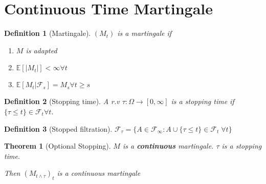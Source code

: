 \documentclass{article}
\newtheorem{theorem}{Theorem}
\newtheorem{definition}{Definition}
\begin{document}
\section{Continuous Time Martingale}
\begin{definition}[Martingale]
  $(M_t)$ is a martingale if
  \begin{enumerate}
  \item $M$ is adapted
  \item $\mathbb E[|M_t|] < \infty \forall t$
  \item $\mathbb E[M_t | \mathcal F_s] = M_s \forall t \ge s$
  \end{enumerate}
\end{definition}

\begin{definition}[Stopping time]
  A r.v $\tau :\Omega \rightarrow [0, \infty]$ is a stopping time if $\{ \tau \le t \} \in \mathcal F_t \forall t$.
\end{definition}
\begin{definition}[Stopped filtration]
  $\mathcal F_{\tau} = \{ A \in \mathcal F_{\infty} : A \cup \{ \tau \le t \} \in \mathcal F_t \; \forall t \}$
\end{definition}
\begin{theorem}[Optional Stopping]
  $M$ is a \textbf{continuous} martingale.
  $\tau$ is a stopping time.

  Then $(M_{t \wedge \tau})_t$ is a continuous martingale
\end{theorem}
\end{document}
